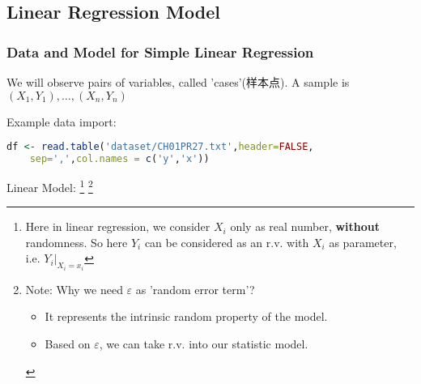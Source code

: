 \subsection{Linear Regression Model}



    


        
\subsubsection{Data and Model for Simple Linear Regression}

    We will observe pairs of variables, called 'cases'(样本点). A sample is $ (X_1,Y_1),\ldots,(X_n,Y_n) $

\begin{rcode}
    Example data import:
\begin{lstlisting}[language=R]
df <- read.table('dataset/CH01PR27.txt',header=FALSE,
    sep=',',col.names = c('y','x'))
\end{lstlisting}
\end{rcode}

    Linear Model: \footnote{Here in linear regression, we consider $ X_i $ only as real number, \textbf{without} randomness. So here $ Y_i $ can be considered as an r.v. with $ X_i $ as parameter, i.e. $ Y_i|_{X_i=x_i} $}
    \footnote{Note: Why we need $ \varepsilon $ as 'random error term'?
    \begin{itemize}[topsep=6pt,itemsep=4pt]
        \item It represents the intrinsic random property of the model.
        \item Based on $ \varepsilon  $, we can take r.v. into our statistic model.
    \end{itemize}
    }
    

